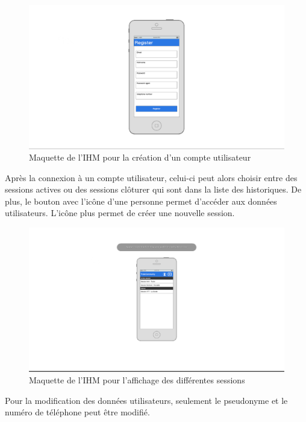 \documentclass[titlepage, 12pt]{report}
\begin{document}
\begin{figure}[h]
	\caption{Maquette de l'IHM pour la création d'un compte utilisateur}
	\label{create_user_account}
	\centering
	\includegraphics[scale=0.2]{Images/mockups/register.png}
\end{figure}

Après la connexion à un compte utilisateur, celui-ci peut alors choisir entre des sessions actives ou des sessions clôturer qui sont dans la liste des historiques. De plus, le bouton avec l'icône d'une personne permet d'accéder aux données utilisateurs. L'icône plus permet de créer une nouvelle session.

\begin{figure}[h]
	\caption{Maquette de l'IHM pour l'affichage des différentes sessions}
	\label{all_sessions}
	\centering
	\includegraphics[scale=0.2]{Images/mockups/session_view.png}
\end{figure}

Pour la modification des données utilisateurs, seulement le pseudonyme et le numéro de téléphone peut être modifié.
\end{document}
